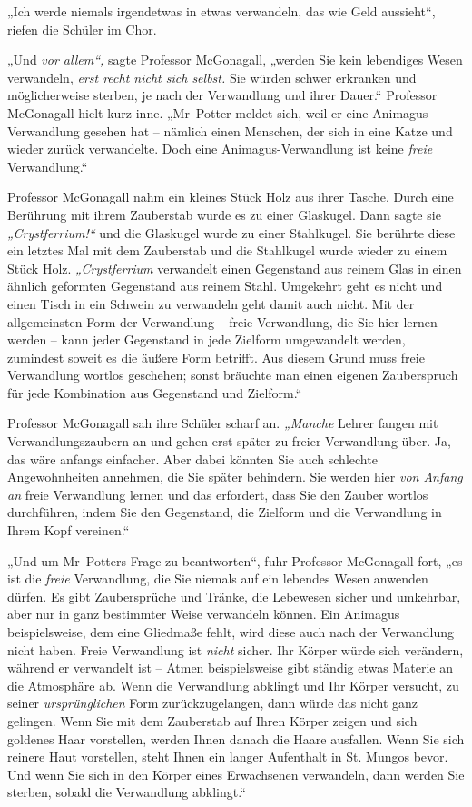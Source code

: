{„Ich werde niemals irgendetwas in etwas verwandeln, das wie Geld aussieht“, riefen die Schüler im Chor.

„Und \emph{vor allem“,} sagte Professor McGonagall, „werden Sie kein lebendiges Wesen verwandeln, \emph{erst recht nicht sich selbst.} Sie würden schwer erkranken und möglicherweise sterben, je nach der Verwandlung und ihrer Dauer.“ Professor McGonagall hielt kurz inne. „Mr~Potter meldet sich, weil er eine Animagus-Verwandlung gesehen hat -- nämlich einen Menschen, der sich in eine Katze und wieder zurück verwandelte. Doch eine Animagus-Verwandlung ist keine \emph{freie} Verwandlung.“

Professor McGonagall nahm ein kleines Stück Holz aus ihrer Tasche. Durch eine Berührung mit ihrem Zauberstab wurde es zu einer Glaskugel. Dann sagte sie \emph{„Crystferrium!“} und die Glaskugel wurde zu einer Stahlkugel. Sie berührte diese ein letztes Mal mit dem Zauberstab und die Stahlkugel wurde wieder zu einem Stück Holz. \emph{„Crystferrium} verwandelt einen Gegenstand aus reinem Glas in einen ähnlich geformten Gegenstand aus reinem Stahl. Umgekehrt geht es nicht und einen Tisch in ein Schwein zu verwandeln geht damit auch nicht. Mit der allgemeinsten Form der Verwandlung -- freie Verwandlung, die Sie hier lernen werden -- kann jeder Gegenstand in jede Zielform umgewandelt werden, zumindest soweit es die äußere Form betrifft. Aus diesem Grund muss freie Verwandlung wortlos geschehen; sonst bräuchte man einen eigenen Zauberspruch für jede Kombination aus Gegenstand und Zielform.“

Professor McGonagall sah ihre Schüler scharf an. \emph{„Manche} Lehrer fangen mit Verwandlungszaubern an und gehen erst später zu freier Verwandlung über. Ja, das wäre anfangs einfacher. Aber dabei könnten Sie auch schlechte Angewohnheiten annehmen, die Sie später behindern. Sie werden hier \emph{von Anfang an} freie Verwandlung lernen und das erfordert, dass Sie den Zauber wortlos durchführen, indem Sie den Gegenstand, die Zielform und die Verwandlung in Ihrem Kopf vereinen.“

„Und um Mr~Potters Frage zu beantworten“, fuhr Professor McGonagall fort, „es ist die \emph{freie} Verwandlung, die Sie niemals auf ein lebendes Wesen anwenden dürfen. Es gibt Zaubersprüche und Tränke, die Lebewesen sicher und umkehrbar, aber nur in ganz bestimmter Weise verwandeln können. Ein Animagus beispielsweise, dem eine Gliedmaße fehlt, wird diese auch nach der Verwandlung nicht haben. Freie Verwandlung ist \emph{nicht} sicher. Ihr Körper würde sich verändern, während er verwandelt ist -- Atmen beispielsweise gibt ständig etwas Materie an die Atmosphäre ab. Wenn die Verwandlung abklingt und Ihr Körper versucht, zu seiner \emph{ursprünglichen} Form zurückzugelangen, dann würde das nicht ganz gelingen. Wenn Sie mit dem Zauberstab auf Ihren Körper zeigen und sich goldenes Haar vorstellen, werden Ihnen danach die Haare ausfallen. Wenn Sie sich reinere Haut vorstellen, steht Ihnen ein langer Aufenthalt in St. Mungos bevor. Und wenn Sie sich in den Körper eines Erwachsenen verwandeln, dann werden Sie sterben, sobald die Verwandlung abklingt.“

}
